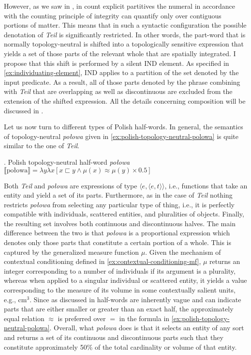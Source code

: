 	However, as we saw in , in count explicit partitives the numeral in accordance with the counting principle of integrity can quantify only over contiguous portions of matter. This means that in such a syntactic configuration the possible denotation of \textit{Teil} is significantly restricted. In other words, the part-word that is normally topology-neutral is shifted into a topologically sensitive expression that yields a set of those parts of the relevant whole that are spatially integrated. I propose that this shift is performed by a silent IND element. As specified in \ref{ex:individuating-element}, IND applies  to a partition of the set denoted by the input predicate. As a result, all of those parts denoted by the phrase combining with \textit{Teil} that are overlapping as well as discontinuous are excluded from the extension of the shifted expression. All the details concerning composition will be discussed in .
	
	Let us now turn to different types of Polish half-words. In general, the semantics of topology-neutral \textit{połowa} given in \ref{ex:polish-topology-neutral-polowa} is quite similar to the one of \textit{Teil}.  
	
	\ex. Polish topology-neutral half-word \textit{połowa}\\
	$\llbracket \text{połowa}\rrbracket = \lambda y \lambda x [x \sqsubset y \wedge \mu(x) \approx \mu(y) \times 0.5]$\label{ex:polish-topology-neutral-polowa}
	
	Both \textit{Teil} and \textit{połowa} are expressions of type $\langle e,\langle e,t\rangle\rangle$, i.e., functions that take an entity and yield a set of its parts. Furthermore, as in the case of \textit{Teil} nothing restricts \textit{połowa} from selecting any particular type of thing, i.e., it is perfectly compatible with individuals, scattered entities, and pluralities of objects. Finally, the resulting set involves both continuous and discontinuous halves. The main difference between the two is that \textit{połowa} is a proportional expression which denotes only those parts that constitute a certain portion of a whole. This is captured by the generalized measure function $\mu$. Given the mechanism of contextual conditioning defined in \ref{ex:contextual-conditioning-mf}, $\mu$ returns an integer corresponding to a number of individuals if its argument is a plurality, whereas when applied to a singular individual or scattered entity, it yields a value corresponding to the measure of its volume in some contextually salient units, e.g., cm$^3$. Since as discussed in  half-words are inherently vague and can indicate parts that are either smaller or greater than an exact half, the approximately equal relation $\approx$ is preferred over $=$ in the formula in \ref{ex:polish-topology-neutral-polowa}. Overall, what \textit{połowa} does is that it selects an entity of any sort and returns a set of its continuous and discontinuous parts such that they constitute approximately 50\% of the total cardinality or volume of that entity.\largerpage
	
